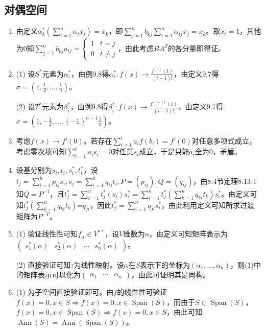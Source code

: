 \documentclass[a4paper,UTF8,fontset=windows]{ctexart}
\DeclareMathOperator{\Ann}{Ann}
\DeclareMathOperator{\Span}{Span}
\begin{document}
\subsection{对偶空间}
\begin{enumerate}
\item
由定义$\alpha_k^*\left(\sum_{i=1}^n\alpha_ix_i\right)=x_k$，即$\sum_{j=1}^nb_{kj}\sum_{i=1}^n\alpha_{ij}x_j=x_k$。取$x_t=1$，其他为0知$\sum_{j=1}^nb_{kj}a_{tj}=\begin{cases}1&t=j\\0&t\ne j\end{cases}$，由此考虑$BA^T$的各分量即得证。

\item
(1) 设$S^*$元素为$\alpha_i^*$，由例9.8得$\alpha_i^*:f(x)\to\frac{f^{(0)}(1)}{(i-1)!}$，由定义9.7得$\sigma=\left(1,\frac{1}{2},\dots,\frac{1}{n}\right)$。

(2) 设$T^*$元素为$\beta_i^*$，由例9.8得$\beta_i^*:f(x)\to\frac{f^{(i-1)}(1)}{(i-1)!}$，由定义9.7得$\sigma=\left(1,-\frac{1}{2},\dots,(-1)^{n-1}\frac{1}{n}\right)$。

\item
考虑$f(x)\to f'(0)$。若存在$\sum_{i=1}^ta_if(b_i)=f'(0)$对任意多项式成立，考虑零次项可知$\sum_{i=1}^ta_is_i=0$对任意$s_i$成立，于是只能$a_i$全为0，矛盾。

\item
设基分别为$s_i,t_i,s_i^*,t_i^*$，设$t_j=\sum_{i=1}^np_{ij}s_i,s_j=\sum_{i=1}^nq_{ij}t_i,P=(p_{ij}),Q=(q_{ij})$，由8.4节定理8.13-1知$Q=P^{-1}$，且$t_j^*=\sum_{i=1}^nt_j^*(s_i)s_i^*=\sum_{i=1}^nt_j^*\left(\sum_{k=1}^nq_{ki}t_k\right)s_i^*$。由定义可知$t_j^*\left(\sum_{k=1}^nq_{ki}t_k\right)$=$q_{ji}$，因此$t_j^*=\sum_{i=1}^nq_{ji}s_i^*$，由此利用定义可知所求过渡矩阵为$P^{-T}$。

\item
(1) 验证线性性可知$f_\alpha\in V^{**}$，设$V$维数为$n$，由定义可知矩阵表示为$\begin{pmatrix}s_1^*(\alpha)&s_2^*(\alpha)&\cdots&s_n^*(\alpha)\end{pmatrix}$。

(2) 直接验证可知$\tau$为线性映射。设$\alpha$在$S$表示下的坐标为$(\alpha_1,\dots,\alpha_n)$，则(1)中的矩阵表示可以化为$\begin{pmatrix}\alpha_1&\cdots&\alpha_n\end{pmatrix}$，由此可证明其是同构。

\item
(1) 为子空间直接验证即可。由$f$的线性性可验证$f(x)=0,x\in S\Rightarrow f(x)=0,x\in\Span(S)$，而由于$S\subset\Span(S)$，$f(x)=0,x\in \Span(S)\Rightarrow f(x)=0,x\in S$，由此可知$\Ann(S)=\Ann(\Span(S))$。


\end{enumerate}
\end{document}
